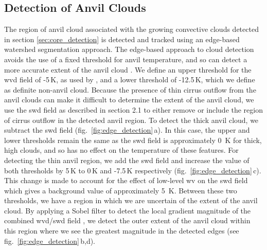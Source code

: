 \subsection{Detection of Anvil Clouds} \label{sec:anvil_detection}

The region of anvil cloud associated with the growing convective clouds detected in section \ref{sec:core_detection} is detected and tracked using an edge-based watershed segmentation approach.
The edge-based approach to cloud detection avoids the use of a fixed threshold for anvil temperature, and so can detect a more accurate extent of the anvil cloud \citep{dim_alternative_2013}.
We define an upper threshold for the \acrshort{wvd} field of -5\,\unit{K}, as used by \citet{muller_role_2018}, and a lower threshold of -12.5\,\unit{K}, which we define as definite non-anvil cloud.
Because the presence of thin cirrus outflow from the anvil clouds can make it difficult to determine the extent of the anvil cloud, we use the \acrshort{swd} field as described in section 2.1 to either remove or include the region of cirrus outflow in the detected anvil region.
To detect the thick anvil cloud, we subtract the \acrshort{swd} field (fig.~\ref{fig:edge_detection}\,a).
In this case, the upper and lower thresholds remain the same as the \acrshort{swd} field is approximately 0~K for thick, high clouds, and so has no effect on the temperature of these features.
For detecting the thin anvil region, we add the \acrshort{swd} field and increase the value of both thresholds by 5\,\unit{K} to 0\,\unit{K} and -7.5\,\unit{K} respectively (fig.~\ref{fig:edge_detection}\,c).
This change is made to account for the effect of low-level \acrshort{wv} on the \acrshort{swd} field which gives a background value of approximately 5~K.
Between these two thresholds, we have a region in which we are uncertain of the extent of the anvil cloud.
By applying a Sobel filter to detect the local gradient magnitude of the combined \acrshort{wvd}/\acrshort{swd} field \citep{sobel_isotropic_2014}, we detect the outer extent of the anvil cloud within this region where we see the greatest magnitude in the detected edges (see fig.~\ref{fig:edge_detection}\,b,d).


